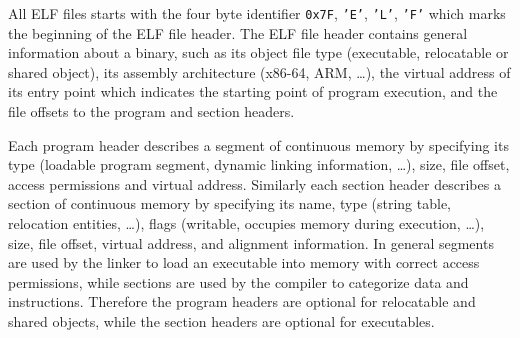 \documentclass[12pt, a4paper]{article}
\begin{document}
All ELF files starts with the four byte identifier \texttt{0x7F}, \texttt{'E'}, \texttt{'L'}, \texttt{'F'} which marks the beginning of the ELF file header. The ELF file header contains general information about a binary, such as its object file type (executable, relocatable or shared object), its assembly architecture (x86-64, ARM, …), the virtual address of its entry point which indicates the starting point of program execution, and the file offsets to the program and section headers.

Each program header describes a segment of continuous memory by specifying its type (loadable program segment, dynamic linking information, …), size, file offset, access permissions and virtual address. Similarly each section header describes a section of continuous memory by specifying its name, type (string table, relocation entities, …), flags (writable, occupies memory during execution, …), size, file offset, virtual address, and alignment information. In general segments are used by the linker to load an executable into memory with correct access permissions, while sections are used by the compiler to categorize data and instructions. Therefore the program headers are optional for relocatable and shared objects, while the section headers are optional for executables.
\end{document}

